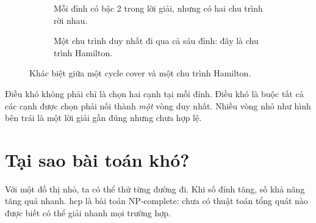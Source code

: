 \documentclass[11pt,a4paper,oneside]{scrreprt}
\begin{document}
\begin{figure}[H]
\centering
\begin{subfigure}[t]{0.47\textwidth}
\centering
{}
\caption{Mỗi đỉnh có bậc 2 trong lời giải, nhưng có hai chu trình rời nhau.}
\end{subfigure}\hfill
\begin{subfigure}[t]{0.47\textwidth}
\centering
{}
\caption{Một chu trình duy nhất đi qua cả sáu đỉnh: đây là chu trình Hamilton.}
\end{subfigure}
\caption{Khác biệt giữa một cycle cover và một chu trình Hamilton.}
\label{fig:cycle-cover}
\end{figure}

\begin{intuitionbox}
Điều khó không phải chỉ là chọn hai cạnh tại mỗi đỉnh. Điều khó là buộc tất cả các cạnh được chọn phải nối thành \emph{một} vòng duy nhất. Nhiều vòng nhỏ như hình bên trái là một lời giải gần đúng nhưng chưa hợp lệ.
\end{intuitionbox}

\section{Tại sao bài toán khó?}

Với một đồ thị nhỏ, ta có thể thử từng đường đi. Khi số đỉnh tăng, số khả năng tăng quá nhanh. hcp{} là bài toán NP-complete: chưa có thuật toán tổng quát nào được biết có thể giải nhanh mọi trường hợp.
\end{document}

